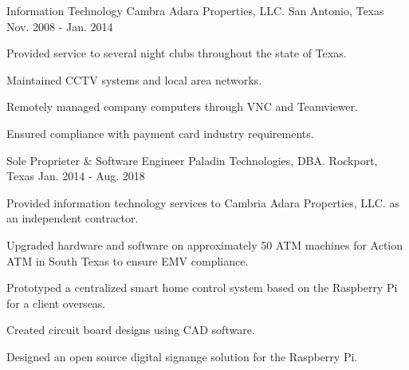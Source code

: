 

\begin{cventries}

  \cventry
    {Information Technology} %
    {Cambra Adara Properties, LLC.} %
    {San Antonio, Texas} %
    {Nov. 2008 - Jan. 2014} %
    {
      \begin{cvitems} %
        \item {
			Provided service to several night clubs throughout the
			state of Texas.
		}
        \item {
			Maintained CCTV systems and local area networks.
		}
		\item {
			Remotely managed company computers through VNC and
			Teamviewer.
		}
		\item {
			Ensured compliance with payment card industry
			requirements.
		}
      \end{cvitems}
    }

  \cventry
    {Sole Proprieter \& Software Engineer} %
    {Paladin Technologies, DBA.} %
    {Rockport, Texas} %
    {Jan. 2014 - Aug. 2018} %
    {
      \begin{cvitems} %
        \item {
			Provided information technology services to Cambria
			Adara Properties, LLC. as an independent contractor.
		}
        \item {
			Upgraded hardware and software on approximately 50 ATM
			machines for Action ATM in South Texas
			\newline
			to ensure EMV compliance.
		}
        \item {
			Prototyped a centralized smart home control system
			based on the Raspberry Pi for a client overseas.
		}
        \item {
			Created circuit board designs using CAD software.
		}
        \item {
			Designed an open source digital signange solution
			for the Raspberry Pi.
		}
      \end{cvitems}
    }
\end{cventries}


\begin{cvskills}
\end{cvskills}

